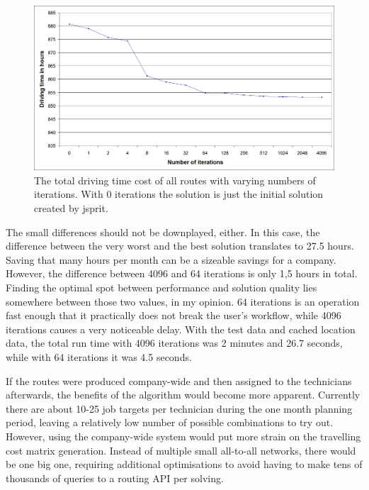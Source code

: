 \begin{figure}[h]
  \begin{center}
    \includegraphics[width=\textwidth]{images/iterations.png}
    \caption{The total driving time cost of all routes with varying numbers of iterations. With 0 iterations the solution is just the initial solution created by jsprit.}
    \label{fig:iterations}
  \end{center}
\end{figure} 

The small differences should not be downplayed, either. In this case, the difference between the very worst and the best solution translates to 27.5 hours. Saving that many hours per month can be a sizeable savings for a company. However, the difference between 4096 and 64 iterations is only 1,5 hours in total. Finding the optimal spot between performance and solution quality lies somewhere between those two values, in my opinion. 64 iterations is an operation fast enough that it practically does not break the user's workflow, while 4096 iterations causes a very noticeable delay. With the test data and cached location data, the total run time with 4096 iterations was 2 minutes and 26.7 seconds, while with 64 iterations it was 4.5 seconds.

If the routes were produced company-wide and then assigned to the technicians afterwards, the benefits of the algorithm would become more apparent. Currently there are about 10-25 job targets per technician during the one month planning period, leaving a relatively low number of possible combinations to try out. However, using the company-wide system would put more strain on the travelling cost matrix generation. Instead of multiple small all-to-all networks, there would be one big one, requiring additional optimisations to avoid having to make tens of thousands of queries to a routing API per solving.   





